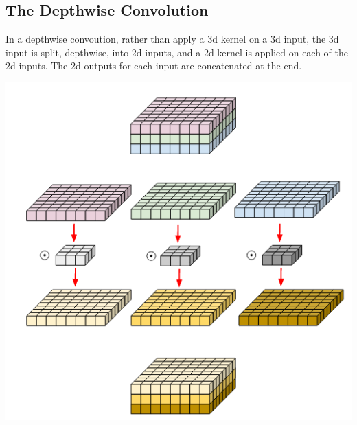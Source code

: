 \documentclass{article}
\begin{document}
\subsection{The Depthwise Convolution}
In a depthwise convoution, rather than apply a 3d kernel on a 3d input, the 3d input is split, depthwise, into 2d inputs, and a 2d kernel is applied on each of the 2d inputs. The 2d outputs for each input are concatenated at the end. 
\begin{center}
\includegraphics[scale=0.35]{depthwise-conv.png}
\end{center}
\end{document}
